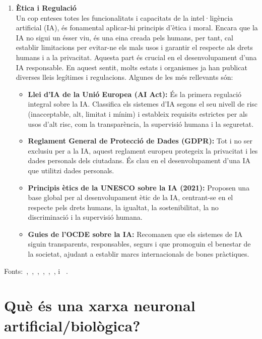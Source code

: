 \begin{enumerate}
    \item \textbf{Ètica i Regulació}\\
    Un cop enteses totes les funcionalitats i capacitats de la intel·ligència artificial (IA), és fonamental aplicar-hi principis d'ètica i moral. Encara que la IA no sigui un ésser viu, és una eina creada pels humans, per tant, cal establir limitacions per evitar-ne els mals usos i garantir el respecte als drets humans i a la privacitat. Aquesta part és crucial en el desenvolupament d'una IA responsable. En aquest sentit, molts estats i organismes ja han publicat diverses lleis legítimes i regulacions. Algunes de les més rellevants són:
    \begin{itemize}
        \item \textbf{Llei d'IA de la Unió Europea (AI Act):} És la primera regulació integral sobre la IA. Classifica els sistemes d'IA segons el seu nivell de risc (inacceptable, alt, limitat i mínim) i estableix requisits estrictes per als usos d'alt risc, com la transparència, la supervisió humana i la seguretat.
        \item \textbf{Reglament General de Protecció de Dades (GDPR):} Tot i no ser exclusiu per a la IA, aquest reglament europeu protegeix la privacitat i les dades personals dels ciutadans. És clau en el desenvolupament d'una IA que utilitzi dades personals.
        \item \textbf{Principis ètics de la UNESCO sobre la IA (2021):} Proposen una base global per al desenvolupament ètic de la IA, centrant-se en el respecte pels drets humans, la igualtat, la sostenibilitat, la no discriminació i la supervisió humana.
        \item \textbf{Guies de l'OCDE sobre la IA:} Recomanen que els sistemes de IA siguin transparents, responsables, segurs i que promoguin el benestar de la societat, ajudant a establir marcs internacionals de bones pràctiques.
    \end{itemize}
\end{enumerate}

Fonts:~\cite{Universitat_oberta_catalunya},~\cite{Generalitat},~\cite{IBM_machine_learning},~\cite{Ultralytics},~\cite{bengio2012},~\cite{Ai_Act}, \cite{Algoritmes} i ~\cite{Unesco}.

\section{Què és una xarxa neuronal artificial/biològica?}\label{sec:xarxa neuronal}

